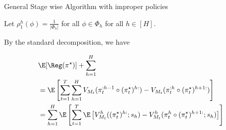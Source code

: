 \begin{algorithm}
\caption{General Stage wise Algorithm with improper policies} \label{alg:general staged AIR}
    Let $\rho_1^h(\phi) = \frac{1}{|\Phi_h|}$ for all $\phi \in \Phi_h$ for all $h\in [H]$. \\
\end{algorithm}

By the standard decomposition, we have

\begin{align*}
&\E[\Reg(\pi^\star)]+\sum_{h=1}^H\\
&=\E\left[\sum_{t=1}^T\sum_{h=1}^HV_{M_t}(\pi_t^{:h-1}\circ(\pi_t^\star)^{h:})-V_{M_t}(\pi_t^{:h}\circ(\pi_t^\star)^{h+1:})\right]\\
&=\sum_{h=1}^H\E\left[\sum_{t=1}^T\E\left[V^h_{M_t}((\pi_t^\star)^{h:};s_h)-V^h_{M_t}(\pi_t^{h}\circ(\pi_t^\star)^{h+1:};s_h)\right]\right]\\
\end{align*}